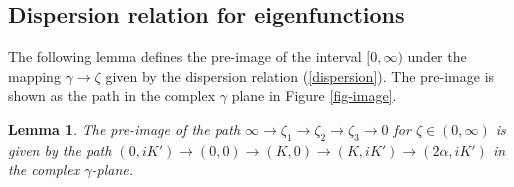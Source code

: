 \documentclass[12pt,reqno]{amsart}
\numberwithin{equation}{section}
\newtheorem{lemma}{Lemma}
\begin{document}
\subsection{Dispersion relation for eigenfunctions}
\label{sec-3-1}


The following lemma defines the pre-image of the interval $[0,\infty)$ 
under the mapping $\gamma \to \zeta$ given by the dispersion relation (\ref{dispersion}). The pre-image is shown 
as the path in the complex $\gamma$ plane in Figure \ref{fig-image}.

\begin{lemma}
	\label{lem-beta}
	The pre-image of the path $\infty \to \zeta_1 \to \zeta_2 \to \zeta_3 \to 0$ for $\zeta \in (0,\infty)$ is given by the path $(0,iK') \to (0,0) \to (K,0) \to (K,iK') \to (2\alpha,iK')$ in the complex $\gamma$-plane.
\end{lemma}
\end{document}
